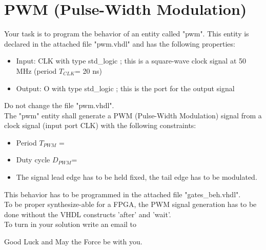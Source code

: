 \documentclass[a4paper,12pt]{article}
\begin{document}
\pagestyle{empty}
\setlength{\parindent}{0em} 
\section*{PWM (Pulse-Width Modulation)}
Your task is to program the behavior of an entity called "pwm". This entity is declared in the attached file "pwm.vhdl" and has the following properties:

\begin{itemize}
\item Input:  CLK with type std\_logic ; this is a square-wave clock signal at 50 MHz (period $T_{CLK}$= 20 ns)
\item Output: O with type std\_logic ; this is the port for the output signal
\end{itemize}
\begin{center}
\end{center}

Do not change the file "pwm.vhdl".
\\

The "pwm" entity shall generate a PWM (Pulse-Width Modulation) signal from a clock signal (input port CLK) with the following constraints:
\begin{itemize}
\item Period $T_{PWM}$ = %
\item Duty cycle $D_{PWM}$= %
\item The signal lead edge has to be held fixed, the tail edge has to be modulated.
\end{itemize}
\vspace{0.3cm}

This behavior has to be programmed in the attached file "gates\_beh.vhdl".
\\

To be proper synthesize-able for a FPGA, the PWM signal generation has to be done without the VHDL constructs 'after' and 'wait'.
\\

To turn in your solution write an email to %

\vspace{0.7cm}

Good Luck and May the Force be with you.
\end{document}
